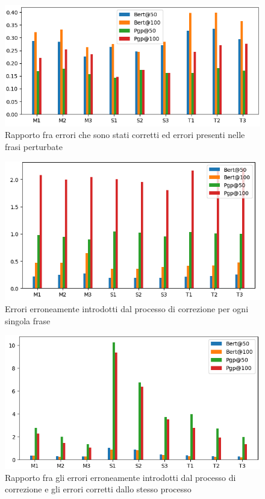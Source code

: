 \documentclass[12pt]{article}
\begin{document}
\begin{figure}[H]
\centering
\includegraphics[width=\textwidth]{immagini/cpp_100}
\caption{Rapporto fra errori che sono stati corretti ed errori presenti nelle frasi perturbate}
\end{figure}

\begin{figure}[H]
\centering
\includegraphics[width=\textwidth]{immagini/ips_100}
\caption{Errori erroneamente introdotti dal processo di correzione per ogni singola frase}
\end{figure}

\begin{figure}[H]
\centering
\includegraphics[width=\textwidth]{immagini/ipc_100}
\caption{Rapporto fra gli errori erroneamente introdotti dal processo di correzione e gli errori corretti dallo stesso processo}
\end{figure}
\end{document}
